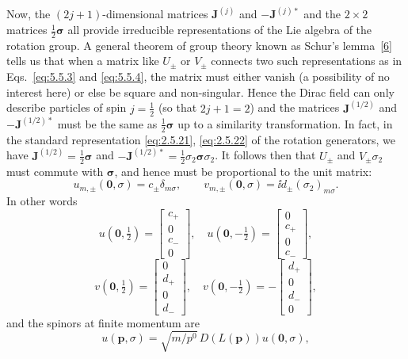 Now, the $(2j+1)$-dimensional matrices $\mathbf J^{(j)}$ and
$-\mathbf J^{(j)*}$ and the $2\times2$ matrices
$\frac12\boldsymbol{\sigma}$ all provide irreducible representations of the
Lie algebra of the rotation group. A general theorem of group theory known as
Schur's lemma~\hyperref[ref:5.6]{[6]} tells us that when a matrix like $U_\pm$ or $V_\pm$ connects
two such representations as in Eqs.~\eqref{eq:5.5.3} and \eqref{eq:5.5.4}, the matrix must
either vanish (a possibility of no interest here) or else be square and
non-singular. Hence the Dirac field can only describe particles of spin
$j=\frac12$ (so that $2j+1=2$) and the matrices $\mathbf J^{(1/2)}$ and
$-\mathbf J^{(1/2)*}$ must be the same as
$\frac12\boldsymbol{\sigma}$ up to a similarity transformation. In fact, in
the standard representation \eqref{eq:2.5.21}, \eqref{eq:2.5.22} of the rotation generators, we
have $\mathbf J^{(1/2)}=\frac12\boldsymbol{\sigma}$ and
$-\mathbf J^{(1/2)*}=\frac12\sigma_2\boldsymbol{\sigma}\sigma_2$. It follows
then that $U_\pm$ and $V_\pm\sigma_2$ must commute with
$\boldsymbol{\sigma}$, and hence must be proportional to the unit matrix:
\begin{equation}
u_{m,\pm}(\mathbf0,\sigma)=c_\pm\delta_{m\sigma},
\qquad
v_{m,\pm}(\mathbf0,\sigma)=\ii d_\pm(\sigma_2)_{m\sigma}.
\tag{5.5.5}\label{eq:5.5.5}
\end{equation}
In other words
\[
u(\mathbf0,\tfrac12)=\begin{bmatrix}c_+\\0\\c_-\\0\end{bmatrix},
\quad
u(\mathbf0,-\tfrac12)=\begin{bmatrix}0\\c_+\\0\\c_-\end{bmatrix},
\]
\[
v(\mathbf0,\tfrac12)=\begin{bmatrix}0\\d_+\\0\\d_-\end{bmatrix},
\quad
v(\mathbf0,-\tfrac12)=-\begin{bmatrix}d_+\\0\\d_-\\0\end{bmatrix},
\]
and the spinors at finite momentum are
\begin{equation}
u(\mathbf p,\sigma)=\sqrt{m/p^0}\,D(L(\mathbf p))u(\mathbf0,\sigma),
\tag{5.5.6}\label{eq:5.5.6}
\end{equation}
